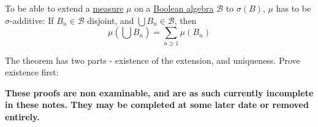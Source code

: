 \documentclass{article}
\newcommand{\1}[1]{\mathbbm{1}_{#1}}
\begin{document}

\begin{remark}
    To be able to extend a \hyperlink{def:measure}{measure} $\mu$ on a \hyperlink{def:boolAlg}{Boolean algebra} $\mathcal{B}$ to $\sigma(B)$, $\mu$ has to be $\sigma$-additive:
    If $B_n \in \mathcal{B}$ disjoint, and $\bigcup B_n \in \mathcal{B}$, then
    \begin{equation*}
        \mu\left(\bigcup B_n\right) = \sum_{n \geq 1} \mu(B_n)
    \end{equation*}
\end{remark}



The theorem has two parts - existence of the extension, and uniqueness.  Prove existence first:

\textbf{These proofs are non examinable, and are as such currently incomplete in these notes. They may be completed at some later date or removed entirely.}
\end{document}
